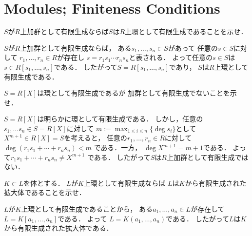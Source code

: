 \section{Modules; Finiteness Conditions}

\begin{prob}
  $S$が$R$上加群として有限生成ならば$S$は$R$上環として有限生成であることを示せ．
\end{prob}
\begin{ans}
  $S$が$R$上加群として有限生成ならば，
  ある$s_1, \dots , s_n \in S$があって
  任意の$s\in S$に対して
  $r_1, \dots, r_n \in R$が存在し
  $s = r_1 s_1 \cdots r_n s_n $と表される．
  よって任意の$s \in S$は
  $s \in R[s_1, \dots, s_n ]$である．
  したがって$S = R[s_1, \dots, s_n ]$であり，
  $S$は$R$上環として有限生成である．
\end{ans}

\begin{prob}
  $S = R[X]$は環として有限生成であるが
  加群として有限生成でないことを示せ．
\end{prob}
\begin{ans}
  $S = R[X]$は明らかに環として有限生成である．
  しかし，任意の$s_1, \dots s_n \in S = R[X]$に対して
  $ m := \max_{1 \le i \le n} \{ \deg s_i \} $として
  $X^{m+1} \in R[X] = S $を考えると，
  任意の$r_1, \dots , r_n \in R$に対して
  $ \deg ( r_1 s_1 + \cdots + r_n s_n ) < m $
  である．一方，
  $ \deg X^{m+1} = m + 1 $である．
  よって$ r_1 s_1 + \cdots + r_n s_n \ne X^{m+1} $
  である．
  したがって$S$は$R$上加群として有限生成ではない．
\end{ans}

\begin{prob}
  $K \subset L$を体とする．
  $L$が$K$上環として有限生成ならば
  $L$は$K$から有限生成された拡大体であることを示せ．
\end{prob}
\begin{ans}
  $L$が$K$上環として有限生成であることから，
  ある$a_1, \dots , a_n \in L$が存在して
  $ L = K[a_1, \dots, a_n] $である．
  よって
  $ L = K( a_1, \dots , a_n ) $である．
  したがって$L$は$K$から有限生成された拡大体である．
\end{ans}
